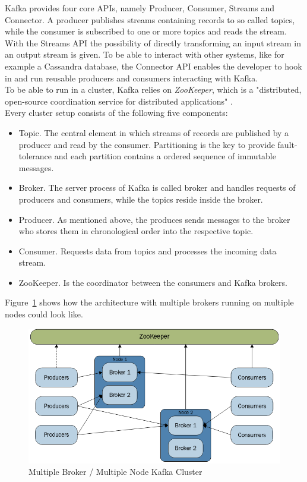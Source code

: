 Kafka provides four core APIs, namely Producer, Consumer, Streams and Connector.
A producer publishes streams containing records to so called topics, while the consumer is subscribed to one or more topics and reads the stream.
With the Streams API the possibility of directly transforming an input stream in an output stream is given.
To be able to interact with other systems, like for example a Cassandra database, the Connector API enables the developer to hook in and run reusable producers and consumers interacting with Kafka.\\
To be able to run in a cluster, Kafka relies on \textit{ZooKeeper}, which is a "distributed, open-source coordination service for distributed applications" \cite{apache_zookeeper}.\\
Every cluster setup consists of the following five components:
\begin{itemize}
    \item Topic. The central element in which streams of records are published by a producer and read by the consumer.
        Partitioning is the key to provide fault-tolerance and each partition contains a ordered sequence of immutable messages.
    \item Broker. The server process of Kafka is called broker and handles requests of producers and consumers, while the topics reside inside the broker.
    \item Producer. As mentioned above, the produces sends messages to the broker who stores them in chronological order into the respective topic.
    \item Consumer. Requests data from topics and processes the incoming data stream.
    \item ZooKeeper. Is the coordinator between the consumers and Kafka brokers.
\end{itemize}

Figure~\ref{fig:kafka_multinode_multibroker} shows how the architecture with multiple brokers running on multiple nodes could look like.

\begin{figure}[!htbp]
  \centering
  \includegraphics[keepaspectratio=true,scale=0.5]{img/kafka_multinode_multibroker}
    \caption{Multiple Broker / Multiple Node Kafka Cluster \cite{garg2013apache}}
  \label{fig:kafka_multinode_multibroker}
\end{figure}



